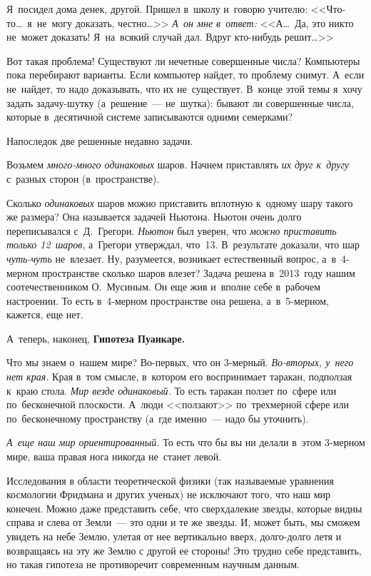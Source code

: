 
Я~посидел дома денек, другой. Пришел в~школу и~говорю учителю: <<Что-то\ldots\ я~не~могу доказать,
честно\ldots>> \textit{А~он мне в~ответ:} <<А\ldots\ Да, это никто не~может доказать! Я~на~всякий случай дал. Вдруг
кто-нибудь решит\ldots>>

\pagebreak

Вот такая проблема! Существуют ли нечетные совершенные числа? Компьютеры пока
перебирают варианты. Если компьютер найдет, то проблему снимут. А~если не~найдет, то надо
доказывать, что их не~существует. В~конце этой темы я~хочу задать задачу-шутку (а~решение~---
не~шутка): бывают ли совершенные числа, которые в~десятичной системе записываются одними семерками?

Напоследок две решенные недавно задачи.

Возьмем \textit{много-много одинаковых} шаров. Начнем приставлять \textit{их друг к~другу} с~разных сторон
(в~пространстве).

Сколько \textit{одинаковых} шаров можно приставить вплотную к~одному шару такого же размера? Она называется задачей Ньютона.
Ньютон очень долго переписывался с~Д.~Грегори. \textit{Ньютон} был уверен, что \textit{можно приставить только 12~шаров},
а~Грегори утверждал, что~13.
В~результате доказали, что  шар \textit{чуть-чуть}
не~влезает. Ну, разумеется, возникает естественный вопрос, а~в~4-мерном пространстве сколько
шаров влезет? Задача решена в~2013~году нашим соотечественником О.~Мусиным. Он еще жив и~вполне
себе в~рабочем настроении. То есть в~4-мерном пространстве она решена, а~в~5-мерном, кажется,
еще нет.

А~теперь, наконец, \textbf{Гипотеза Пуанкаре.}

Что мы знаем о~нашем мире? Во-первых, что он 3-мерный. \textit{Во-вторых, у~него нет края.} Края в~том
смысле, в~котором его воспринимает таракан, подползая к~краю стола. \textit{Мир везде одинаковый.} То есть
таракан ползет по~сфере или по~бесконечной плоскости. А~люди <<ползают>> по~трехмерной сфере или
по~бесконечному пространству (а~где именно~--- надо бы уточнить).

\textit{А~еще наш мир ориентированный.} То есть что бы вы ни делали в~этом 3-мерном мире, ваша правая нога
никогда не~станет левой.

Исследования в области теоретической физики (так называемые уравнения
космологии Фридмана и других ученых) не исключают того, что наш мир конечен.
Можно даже представить себе, что сверхдалекие звезды, которые видны справа
и слева от Земли~--- это одни и те же звезды. И, может быть, мы сможем увидеть
на небе Землю, улетая от нее вертикально вверх, долго-долго летя и возвращаясь
на эту же Землю с другой ее стороны! Это трудно себе представить, но такая
гипотеза не противоречит современным научным данным.

